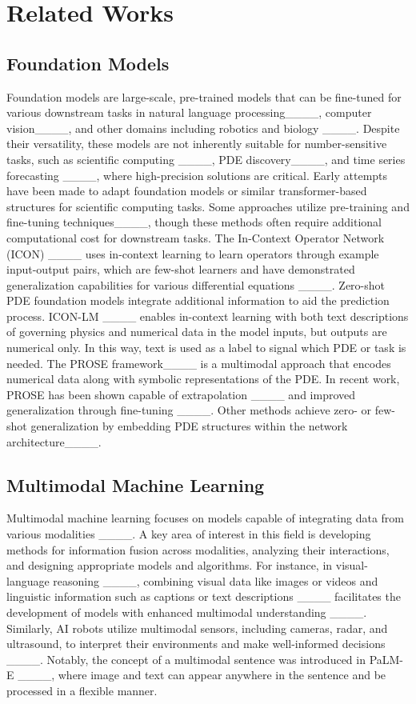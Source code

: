 \section{Related Works}
\subsection{Foundation Models}
Foundation models are large-scale, pre-trained models that can be fine-tuned for various downstream tasks in natural language processing____, computer vision____, and other domains including robotics and biology ____. Despite their versatility, these models are not inherently suitable for number-sensitive tasks, such as scientific computing ____, PDE discovery____, and time series forecasting ____, where high-precision solutions are critical.
Early attempts have been made to adapt foundation models or similar transformer-based structures for scientific computing tasks. Some approaches utilize pre-training and fine-tuning techniques____, though these methods often require additional computational cost for downstream tasks.
The In-Context Operator Network (ICON) ____ uses in-context learning to learn operators through example input-output pairs, which are few-shot learners and have demonstrated generalization capabilities for various differential equations ____. Zero-shot PDE foundation models integrate additional information to aid the prediction process. ICON-LM ____ enables in-context learning with both text descriptions of governing physics and numerical data in the model inputs, but outputs are numerical only. In this way, text is used as a label to signal which PDE or task is needed. The PROSE framework____ is a multimodal approach that encodes numerical data along with symbolic representations of the PDE. In recent work, PROSE has been shown capable of extrapolation ____ and improved generalization through fine-tuning ____.
Other methods achieve zero- or few-shot generalization by embedding PDE structures within the network architecture____.


\subsection{Multimodal Machine Learning}
Multimodal machine learning focuses on models capable of integrating data from various modalities ____. A key area of interest in this field is developing methods for information fusion across modalities, analyzing their interactions, and designing appropriate models and algorithms. For instance, in visual-language reasoning ____, combining visual data like images or videos and linguistic information such as captions or text descriptions ____ facilitates the development of models with enhanced multimodal understanding ____. Similarly, AI robots utilize multimodal sensors, including cameras, radar, and ultrasound, to interpret their environments and make well-informed decisions ____. Notably, the concept of a multimodal sentence was introduced in PaLM-E ____, where image and text can appear anywhere in the sentence and be processed in a flexible manner. 


